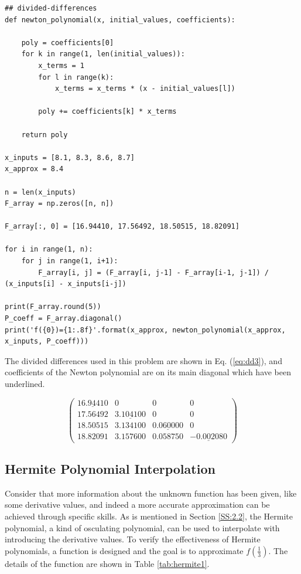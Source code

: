 \documentclass[preprint,12pt]{elsarticle}
\begin{document}
\begin{lstlisting}
## divided-differences
def newton_polynomial(x, initial_values, coefficients):
    
    poly = coefficients[0]
    for k in range(1, len(initial_values)):
        x_terms = 1
        for l in range(k):
            x_terms = x_terms * (x - initial_values[l])
        
        poly += coefficients[k] * x_terms
    
    return poly

x_inputs = [8.1, 8.3, 8.6, 8.7]
x_approx = 8.4

n = len(x_inputs)
F_array = np.zeros([n, n])

F_array[:, 0] = [16.94410, 17.56492, 18.50515, 18.82091]

for i in range(1, n):
    for j in range(1, i+1):
        F_array[i, j] = (F_array[i, j-1] - F_array[i-1, j-1]) / (x_inputs[i] - x_inputs[i-j])

print(F_array.round(5))
P_coeff = F_array.diagonal()
print('f({0})={1:.8f}'.format(x_approx, newton_polynomial(x_approx, x_inputs, P_coeff)))
\end{lstlisting}

The divided differences used in this problem are shown in Eq. (\ref{eq:dd3}), and coefficients of the Newton polynomial are on its main diagonal which have been underlined.

\begin{equation}
\label{eq:dd3}
    \begin{pmatrix}
        \underline{16.94410} & 0 & 0 & 0\\
        17.56492 & \underline{3.104100} & 0 & 0\\
        18.50515 & 3.134100 & \underline{0.060000} & 0\\
        18.82091 & 3.157600 &  0.058750 & \underline{-0.002080}
    \end{pmatrix}
\end{equation}

\subsection{Hermite Polynomial Interpolation}

Consider that more information about the unknown function has been given, like some derivative values, and indeed a more accurate approximation can be achieved through specific skills. As is mentioned in Section \ref{SS:2.2}, the Hermite polynomial, a kind of osculating polynomial, can be used to interpolate with introducing the derivative values. To verify the effectiveness of Hermite polynomials, a function is designed and the goal is to approximate $f(\frac{1}{3})$. The details of the function are shown in Table \ref{tab:hermite1}.
\end{document}
